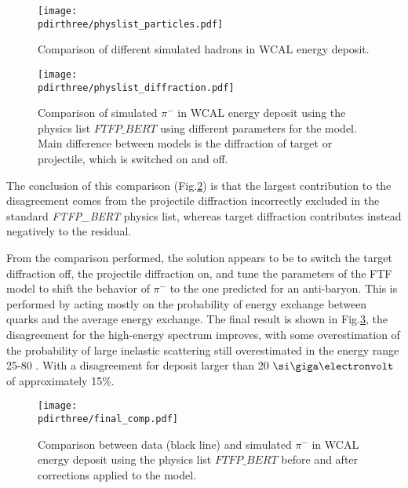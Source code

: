 \begin{figure}[tbh!]
  \centering
  \texttt{[image: \\pdirthree/physlist\_particles.pdf]}
  \caption[Comparison of different simulated hadrons in WCAL energy spectrum]{Comparison of different simulated hadrons in WCAL energy deposit.}
  \label{fig:geant4-hadron-particles}
\end{figure}

\begin{figure}[tbh!]
  \centering
  \texttt{[image: \\pdirthree/physlist\_diffraction.pdf]}
  \caption[Comparison of different diffraction limits for hadrons in WCAL energy spectrum]{Comparison of simulated $\pi^-$ in WCAL energy deposit using the physics list $FTFP\_BERT$ using different parameters for the model. Main difference between models is the diffraction of target or projectile, which is switched on and off.}
  \label{fig:geant4-hadron-diff}
\end{figure}

The conclusion of this comparison (Fig.\ref{fig:geant4-hadron-diff}) is that the largest contribution to the disagreement comes from the projectile diffraction incorrectly excluded in the standard \textit{FTFP\_BERT} physics list, whereas target diffraction contributes instead negatively to the residual.

From the comparison performed, the solution appears to be to switch the target diffraction off, the projectile diffraction on, and tune the parameters of the FTF model to shift the behavior of $\pi^-$ to the one predicted for an anti-baryon. This is performed by acting mostly on the probability of energy exchange between quarks and the average energy exchange. The final result is shown in Fig.\ref{fig:geant4-hadron-final}, the disagreement for the high-energy spectrum improves, with some overestimation of the probability of large inelastic scattering still overestimated in the energy range 25-80 \gev. With a disagreement for deposit larger than 20 $\gev$ of approximately 15\%.

\begin{figure}[tbh!]
  \centering
  \texttt{[image: \\pdirthree/final\_comp.pdf]}
  \caption[Comparison of hadron energy deposit after corrections]{Comparison between data (black line) and simulated $\pi^-$ in WCAL energy deposit using the physics list $FTFP\_BERT$ before and after corrections applied to the model.}
  \label{fig:geant4-hadron-final}
\end{figure}

